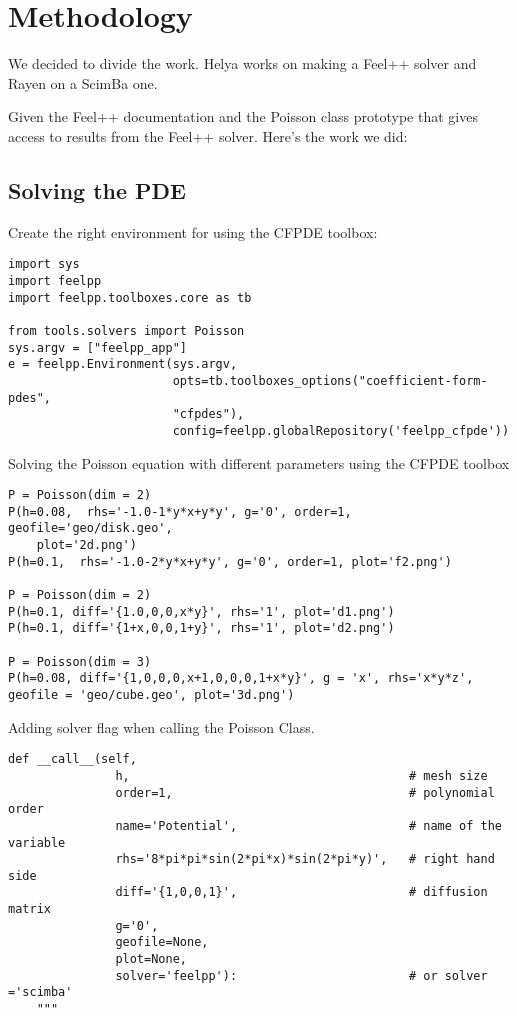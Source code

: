 \documentclass[12pt]{article}
\begin{document}
\newpage
\section{Methodology}
We decided to divide the work. Helya works on making a Feel++ solver and Rayen on a ScimBa one.

Given the Feel++ documentation and the Poisson class prototype that gives access to results from the Feel++ solver. Here's the work we did:
\subsection{Solving the PDE}

Create the right environment for using the CFPDE toolbox:
\begin{lstlisting}
import sys
import feelpp
import feelpp.toolboxes.core as tb

from tools.solvers import Poisson
sys.argv = ["feelpp_app"]
e = feelpp.Environment(sys.argv,
                       opts=tb.toolboxes_options("coefficient-form-pdes", 
                       "cfpdes"),
                       config=feelpp.globalRepository('feelpp_cfpde'))

\end{lstlisting}

Solving the Poisson equation with different parameters using the CFPDE toolbox

\begin{lstlisting}
P = Poisson(dim = 2)
P(h=0.08,  rhs='-1.0-1*y*x+y*y', g='0', order=1, geofile='geo/disk.geo',
    plot='2d.png')
P(h=0.1,  rhs='-1.0-2*y*x+y*y', g='0', order=1, plot='f2.png')

P = Poisson(dim = 2)
P(h=0.1, diff='{1.0,0,0,x*y}', rhs='1', plot='d1.png')
P(h=0.1, diff='{1+x,0,0,1+y}', rhs='1', plot='d2.png')

P = Poisson(dim = 3)
P(h=0.08, diff='{1,0,0,0,x+1,0,0,0,1+x*y}', g = 'x', rhs='x*y*z', 
geofile = 'geo/cube.geo', plot='3d.png') 

\end{lstlisting}

Adding solver flag when calling the Poisson Class.
\begin{lstlisting}
def __call__(self,
               h,                                       # mesh size 
               order=1,                                 # polynomial order 
               name='Potential',                        # name of the variable
               rhs='8*pi*pi*sin(2*pi*x)*sin(2*pi*y)',   # right hand side
               diff='{1,0,0,1}',                        # diffusion matrix
               g='0',
               geofile=None,
               plot=None,
               solver='feelpp'):                        # or solver ='scimba'
    """
\end{lstlisting}
\end{document}
